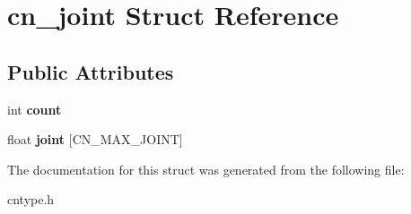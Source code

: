 \hypertarget{structcn__joint}{\section{cn\-\_\-joint Struct Reference}
\label{structcn__joint}
}
\subsection*{Public Attributes}
\begin{DoxyCompactItemize}
\item 
\hypertarget{structcn__joint_a710a6f18a380441a53baca4eb7bd9925}{int {\bfseries count}}\label{structcn__joint_a710a6f18a380441a53baca4eb7bd9925}

\item 
\hypertarget{structcn__joint_a376d0e5b18a7834f7ddf489b29fe52f5}{float {\bfseries joint} \mbox{[}C\-N\-\_\-\-M\-A\-X\-\_\-\-J\-O\-I\-N\-T\mbox{]}}\label{structcn__joint_a376d0e5b18a7834f7ddf489b29fe52f5}

\end{DoxyCompactItemize}


The documentation for this struct was generated from the following file\-:\begin{DoxyCompactItemize}
\item 
cntype.\-h\end{DoxyCompactItemize}

